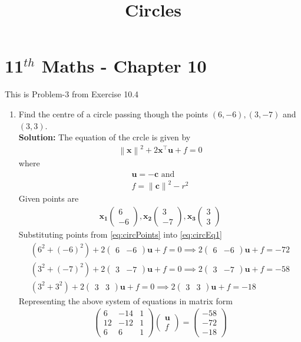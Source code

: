 \documentclass[12pt]{article}
\providecommand{\brak}[1]{\ensuremath{\left(#1\right)}}
\providecommand{\norm}[1]{\left\lVert#1\right\rVert}
\newcommand{\solution}{\noindent \textbf{Solution: }}
\newcommand{\myvec}[1]{\ensuremath{\begin{pmatrix}#1\end{pmatrix}}}
\let\vec\mathbf
\begin{document}
\begin{center}
\title{\textbf{Circles}}
\date{\vspace{-5ex}} %
\maketitle
\end{center}
\setcounter{page}{1}

\section{11$^{th}$ Maths - Chapter 10}
This is Problem-3 from Exercise 10.4
\begin{enumerate}
\item Find the centre of a circle passing though the points $(6,-6), (3,-7)$ and $(3,3)$. \\ 
\solution 
The equation of the crcle is given by 
\begin{align}
	\label{eq:circEq1}
	\norm{\vec{x}}^2+2\vec{x}^\top\vec{u}+f = 0 
\end{align}
where
\begin{align}
	\vec{u} = -\vec{c} \text{ and } \\
        \label{eq:fRelation}
	f = \norm{\vec{c}}^2 - r^2
\end{align}
Given points are 
\begin{align}
	\label{eq:circPoints}
     \vec{x_1}\myvec{6 \\ -6} , \vec{x_2}\myvec{3 \\-7}, \vec{x_3}\myvec{3 \\ 3}
\end{align}
Substituting points from \eqref{eq:circPoints} into \eqref{eq:circEq1}
\begin{align}
	\brak{6^2 + \brak{-6}^2}+2\myvec{6 & -6}\vec{u}+f = 0 \implies 2\myvec{6 & -6}\vec{u} + f = -72 \\ 
	\brak{3^2 + \brak{-7}^2}+2\myvec{3 & -7}\vec{u}+f = 0 \implies 2\myvec{3 & -7}\vec{u} + f = -58 \\
	\brak{3^2 + 3^2}+2\myvec{3 & 3}\vec{u}+f = 0 \implies 2\myvec{3 & 3}\vec{u} + f = -18 
\end{align}
Representing the above system of equations in matrix form
\begin{align}
 \myvec{6 & -14 & 1 \\
	12 & -12 & 1 \\
	6 & 6 & 1
	} \myvec {\vec{u} \\
	           f 
		}  = \myvec{-58 \\ -72 \\ -18 }
\end{align}


\end{enumerate}
\end{document}
